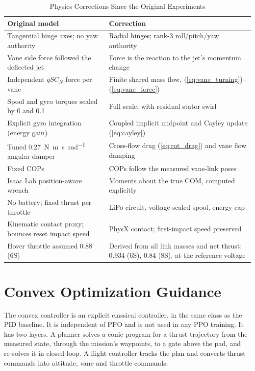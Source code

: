 \documentclass[conference]{IEEEtran}
\begin{document}
\begin{table}[htbp]
\caption{Physics Corrections Since the Original Experiments}
\label{tab:physics_corrections}
\centering
\footnotesize
\setlength{\tabcolsep}{3pt}
\begin{tabular}{>{\raggedright\arraybackslash}p{}>{\raggedright\arraybackslash}p{}}
\toprule
\textbf{Original model} & \textbf{Correction} \\
\midrule
Tangential hinge axes; no yaw authority & Radial hinges; rank-3 roll/pitch/yaw authority \\
Vane side force followed the deflected jet & Force is the reaction to the jet's momentum change \\
Independent $qSC_N$ force per vane & Finite shared mass flow, (\ref{eq:vane_turning})--(\ref{eq:vane_force}) \\
Spool and gyro torques scaled by 0 and 0.1 & Full scale, with residual stator swirl \\
Explicit gyro integration (energy gain) & Coupled implicit midpoint and Cayley update (\ref{eq:cayley}) \\
Tuned \SI{0.27}{\newton\metre\second\per\radian} angular damper & Cross-flow drag (\ref{eq:rot_drag}) and vane flow damping \\
Fixed COPs & COPs follow the measured vane-link poses \\
Isaac Lab position-aware wrench & Moments about the true COM, computed explicitly \\
No battery; fixed thrust per throttle & LiPo circuit, voltage-scaled spool, energy cap \\
Kinematic contact proxy; bounces reset impact speed & PhysX contact; first-impact speed preserved \\
Hover throttle assumed 0.88 (6S) & Derived from all link masses and net thrust: 0.934 (6S), 0.84 (8S), at the reference voltage \\
\bottomrule
\end{tabular}
\end{table}


\section{Convex Optimization Guidance}
\label{sec:convex}

The convex controller is an explicit classical controller, in the same class as the PID baseline. It is independent of PPO and is not used in any PPO training. It has two layers. A planner solves a conic program for a thrust trajectory from the measured state, through the mission's waypoints, to a gate above the pad, and re-solves it in closed loop. A flight controller tracks the plan and converts thrust commands into attitude, vane and throttle commands.
\end{document}

